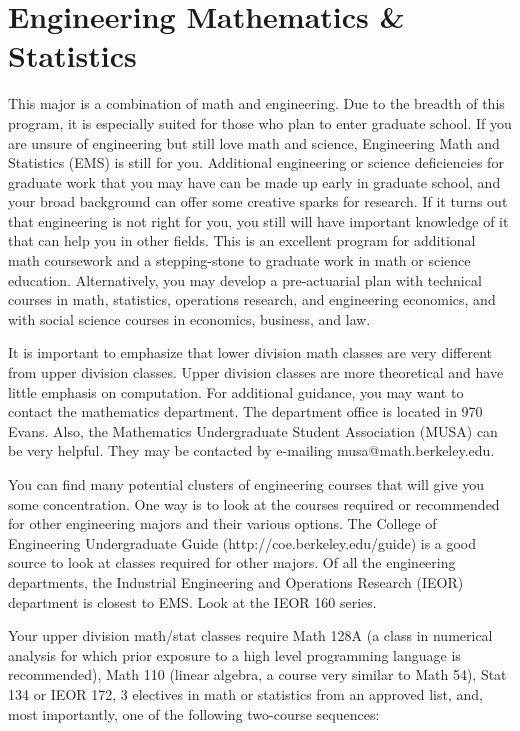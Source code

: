 \chapter*{Engineering Mathematics \& Statistics}

This major is a combination of math and engineering. Due to the breadth of this program, it is especially suited for those who plan to enter graduate school. If you are unsure of engineering but still love math and science, Engineering Math and Statistics (EMS) is still for you. Additional engineering or science deficiencies for graduate work that you may have can be made up early in graduate school, and your broad background can offer some creative sparks for research. If it turns out that engineering is not right for you, you still will have important knowledge of it that can help you in other fields. This is an excellent program for additional math coursework and a stepping-stone to graduate work in math or science education. Alternatively, you may develop a pre-actuarial plan with technical courses in math, statistics, operations research, and engineering economics, and with social science courses in economics, business, and law.

It is important to emphasize that lower division math classes are very different from upper division classes. Upper division classes are more theoretical and have little emphasis on computation. For additional guidance, you may want to contact the mathematics department. The department office is located in 970 Evans. Also, the Mathematics Undergraduate Student Association (MUSA) can be very helpful. They may be contacted by e-mailing musa@math.berkeley.edu.

You can find many potential clusters of engineering courses that will give you some concentration. One way is to look at the courses required or recommended for other engineering majors and their various options. The College of Engineering Undergraduate Guide (http://coe.berkeley.edu/guide) is a good source to look at classes required for other majors. Of all the engineering departments, the Industrial Engineering and Operations Research (IEOR) department is closest to EMS. Look at the IEOR 160 series.

Your upper division math/stat classes require Math 128A (a class in numerical analysis for which prior exposure to a high level programming language is recommended), Math 110 (linear algebra, a course very 
similar to Math 54), Stat 134 or IEOR 172, 3 electives in math or 
statistics from an approved list, and, most importantly, one of the following two-course sequences:

